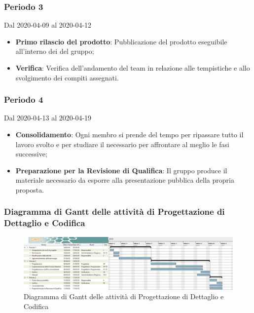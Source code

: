 \subsubsection{Periodo 3}
Dal 2020-04-09 al 2020-04-12\\
\begin{itemize}
	\item \textbf{Primo rilascio del prodotto}: Pubblicazione del prodotto eseguibile all'interno dei  del gruppo;
	\item \textbf{Verifica}: Verifica dell'andamento del team in relazione alle tempistiche e allo svolgimento dei compiti assegnati.
\end{itemize}
\subsubsection{Periodo 4} 
Dal 2020-04-13 al 2020-04-19\\
\begin{itemize}
	\item \textbf{Consolidamento}: Ogni membro si prende del tempo per ripassare tutto il lavoro svolto e per studiare il necessario per affrontare al meglio le fasi successive;
	\item \textbf{Preparazione per la Revisione di Qualifica}: Il gruppo produce il materiale necessario da esporre alla presentazione pubblica della propria proposta.
\end{itemize}

\newpage
\begin{landscape}
\subsubsection{Diagramma di Gantt delle attività di Progettazione di Dettaglio e Codifica}
\pagestyle{empty}
\begin{figure}[h]
	\centering
	\includegraphics[scale=0.476]{Sezioni/DiagrammiGantt/ProgettazioneDiDettaglio.png}
	\caption{Diagramma di Gantt delle attività di Progettazione di Dettaglio e Codifica}
\end{figure}
\end{landscape}

